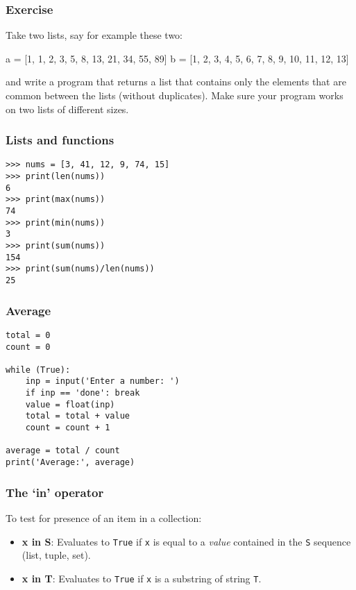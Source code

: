 \begin{frame}[fragile]\frametitle{Exercise}
Take two lists, say for example these two:

  a = [1, 1, 2, 3, 5, 8, 13, 21, 34, 55, 89]
  b = [1, 2, 3, 4, 5, 6, 7, 8, 9, 10, 11, 12, 13]
  
and write a program that returns a list that contains only the elements that are common between the lists (without duplicates). Make sure your program works on two lists of different sizes.
\end{frame}

\begin{frame}[fragile]\frametitle{Lists and functions}
  \begin{lstlisting}
>>> nums = [3, 41, 12, 9, 74, 15]
>>> print(len(nums))
6
>>> print(max(nums))
74
>>> print(min(nums))
3
>>> print(sum(nums))
154
>>> print(sum(nums)/len(nums))
25
  \end{lstlisting}
\end{frame}

\begin{frame}[fragile]\frametitle{Average}
  \begin{lstlisting}
total = 0
count = 0

while (True):
	inp = input('Enter a number: ')
	if inp == 'done': break
	value = float(inp)
	total = total + value
	count = count + 1
	
average = total / count
print('Average:', average)
  \end{lstlisting}
\end{frame}


\begin{frame}[fragile]\frametitle{The `{\ttfamily\bfseries in}' operator}

  To test for presence of an item in a collection:

  \begin{itemize}
  \item {\bf x in S}:   Evaluates to \texttt{True} if \texttt{x} is equal to a \emph{value}
    contained in the \texttt{S} sequence (list, tuple, set).
\item {\bf x in T}: Evaluates to \texttt{True} if \texttt{x} is a substring of
    string \texttt{T}.
  \end{itemize}

\end{frame}


